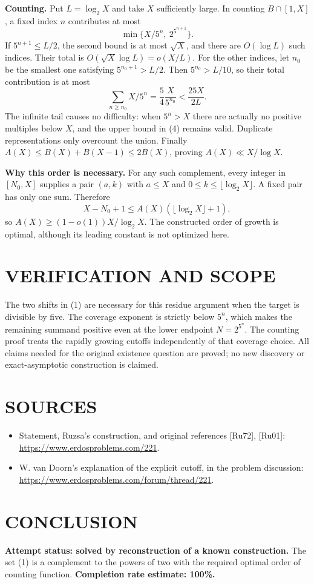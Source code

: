 \textbf{Counting.} Put $L=\log_2X$ and take $X$ sufficiently large. In counting $B\cap[1,X]$, a fixed index $n$ contributes at most
\[
\min\{X/5^n,\ 2^{5^{n+1}}\}.
\tag{3}
\]
If $5^{n+1}\leq L/2$, the second bound is at most $\sqrt X$, and there are $O(\log L)$ such indices. Their total is $O(\sqrt X\log L)=o(X/L)$.
For the other indices, let $n_0$ be the smallest one satisfying $5^{n_0+1}>L/2$. Then $5^{n_0}>L/10$, so their total contribution is at most
\[
\sum_{n\geq n_0}X/5^n
=\frac54\frac{X}{5^{n_0}}<\frac{25X}{2L}.
\tag{4}
\]
The infinite tail causes no difficulty: when $5^n>X$ there are actually no positive multiples below $X$, and the upper bound in (4) remains valid. Duplicate representations only overcount the union. Finally $A(X)\leq B(X)+B(X-1)\leq2B(X)$, proving $A(X)\ll X/\log X$.

\textbf{Why this order is necessary.} For any such complement, every integer in $[N_0,X]$ supplies a pair $(a,k)$ with $a\leq X$ and $0\leq k\leq\lfloor\log_2X\rfloor$. A fixed pair has only one sum. Therefore
\[
X-N_0+1\leq A(X)(\lfloor\log_2X\rfloor+1),
\]
so $A(X)\geq(1-o(1))X/\log_2X$. The constructed order of growth is optimal, although its leading constant is not optimized here.

\section{VERIFICATION AND SCOPE}
The two shifts in (1) are necessary for this residue argument when the target is divisible by five. The coverage exponent is strictly below $5^n$, which makes the remaining summand positive even at the lower endpoint $N=2^{5^n}$. The counting proof treats the rapidly growing cutoffs independently of that coverage choice. All claims needed for the original existence question are proved; no new discovery or exact-asymptotic construction is claimed.

\section{SOURCES}
\begin{itemize}
\item Statement, Ruzsa's construction, and original references [Ru72], [Ru01]: \url{https://www.erdosproblems.com/221}.
\item W. van Doorn's explanation of the explicit cutoff, in the problem discussion: \url{https://www.erdosproblems.com/forum/thread/221}.
\end{itemize}
\section{CONCLUSION}
\textbf{Attempt status: solved by reconstruction of a known construction.} The set (1) is a complement to the powers of two with the required optimal order of counting function.
\textbf{Completion rate estimate: 100\%.}
